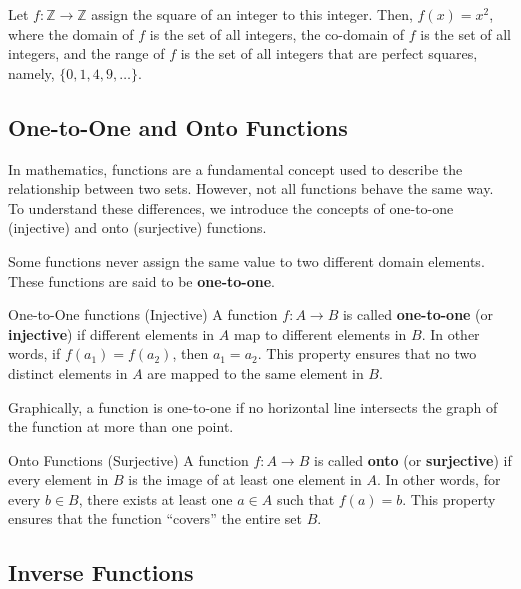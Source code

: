 \begin{example}
    Let $f: \mathbb{Z} \rightarrow \mathbb{Z}$ assign the square of an integer to this integer. Then, $f(x)=x^2$, where the domain of $f$ is the set of all integers, the co-domain of $f$ is the set of all integers, and the range of $f$ is the set of all integers that are perfect squares, namely, $\{0,1,4,9, \ldots\}$.
\end{example}

\subsection*{One-to-One and Onto Functions}
In mathematics, functions are a fundamental concept used to describe the relationship between two sets. However, not all functions behave the same way. To understand these differences, we introduce the concepts of one-to-one (injective) and onto (surjective) functions.

Some functions never assign the same value to two different domain elements. These functions are said to be \textbf{one-to-one}.

\begin{definition} {One-to-One functions (Injective)}
A function \( f: A \rightarrow B \) is called \textbf{one-to-one} (or \textbf{injective}) if different elements in \( A \) map to different elements in \( B \). In other words, if \( f(a_1) = f(a_2) \), then \( a_1 = a_2 \). This property ensures that no two distinct elements in \( A \) are mapped to the same element in \( B \).     
\end{definition}

Graphically, a function is one-to-one if no horizontal line intersects the graph of the function at more than one point.

\begin{definition}{Onto Functions (Surjective)}
A function \( f: A \rightarrow B \) is called \textbf{onto} (or \textbf{surjective}) if every element in \( B \) is the image of at least one element in \( A \). In other words, for every \( b \in B \), there exists at least one \( a \in A \) such that \( f(a) = b \). This property ensures that the function ``covers'' the entire set \( B \).
\end{definition}

\subsection*{Inverse Functions}

